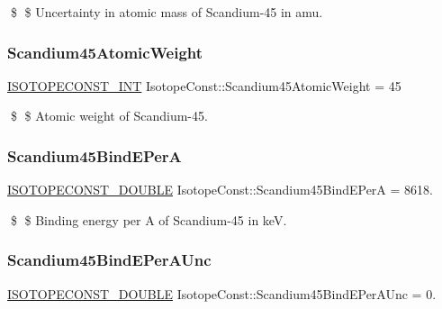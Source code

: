 \$ \$ Uncertainty in atomic mass of Scandium-\/45 in amu. \mbox{\label{group___isotope_const-_scandium-_sc45_ga260c726c21305c9146e2bfe943ea2a39}} 
\subsubsection{\texorpdfstring{Scandium45\+Atomic\+Weight}{Scandium45AtomicWeight}}
{\footnotesize\ttfamily \mbox{\hyperlink{group___isotope_const-_macros_ga5f18360b3e99483a35c32d789e62621c}{I\+S\+O\+T\+O\+P\+E\+C\+O\+N\+S\+T\+\_\+\+I\+NT}} Isotope\+Const\+::\+Scandium45\+Atomic\+Weight = 45}

\$ \$ Atomic weight of Scandium-\/45. \mbox{\label{group___isotope_const-_scandium-_sc45_ga02f1b161f5621ca8383b1a523159b313}} 
\subsubsection{\texorpdfstring{Scandium45\+Bind\+E\+PerA}{Scandium45BindEPerA}}
{\footnotesize\ttfamily \mbox{\hyperlink{group___isotope_const-_macros_ga8f45a7272ce02c0b4c65c44636ed719a}{I\+S\+O\+T\+O\+P\+E\+C\+O\+N\+S\+T\+\_\+\+D\+O\+U\+B\+LE}} Isotope\+Const\+::\+Scandium45\+Bind\+E\+PerA = 8618.}

\$ \$ Binding energy per A of Scandium-\/45 in keV. \mbox{\label{group___isotope_const-_scandium-_sc45_gac5e677bc041b7e6111f8797904d92fe9}} 
\subsubsection{\texorpdfstring{Scandium45\+Bind\+E\+Per\+A\+Unc}{Scandium45BindEPerAUnc}}
{\footnotesize\ttfamily \mbox{\hyperlink{group___isotope_const-_macros_ga8f45a7272ce02c0b4c65c44636ed719a}{I\+S\+O\+T\+O\+P\+E\+C\+O\+N\+S\+T\+\_\+\+D\+O\+U\+B\+LE}} Isotope\+Const\+::\+Scandium45\+Bind\+E\+Per\+A\+Unc = 0.}

